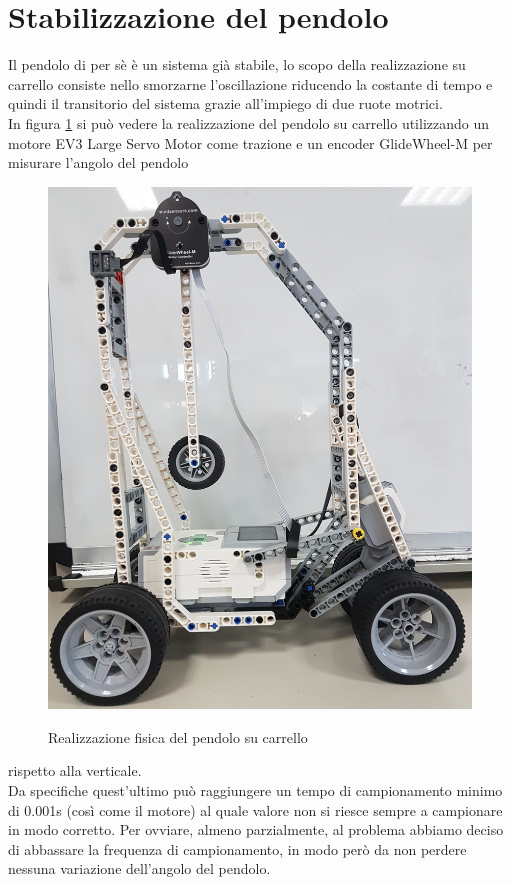 \section{Stabilizzazione del pendolo}
Il pendolo di per sè è un sistema già stabile, lo scopo della realizzazione su carrello consiste nello smorzarne l'oscillazione riducendo la costante di tempo e quindi il transitorio del sistema grazie all'impiego di due ruote motrici.\\
In figura \ref{pendoloFisico} si può vedere la realizzazione del pendolo su carrello utilizzando un motore EV3 Large Servo Motor come trazione e un encoder GlideWheel-M per misurare l'angolo del pendolo 
\begin{figure}[ht]
	\centering
	\includegraphics[scale=0.08]{pendoloFisico.jpg}\\
	\caption{Realizzazione fisica del pendolo su carrello}
	\label{pendoloFisico}
\end{figure} 
rispetto alla verticale.\\
Da specifiche quest'ultimo può raggiungere un tempo di campionamento minimo di 0.001s (così come il motore) al quale valore non si riesce sempre a campionare in modo corretto. Per ovviare, almeno parzialmente, al problema abbiamo deciso di abbassare la frequenza di campionamento, in modo però da non perdere nessuna variazione dell'angolo del pendolo.\\
